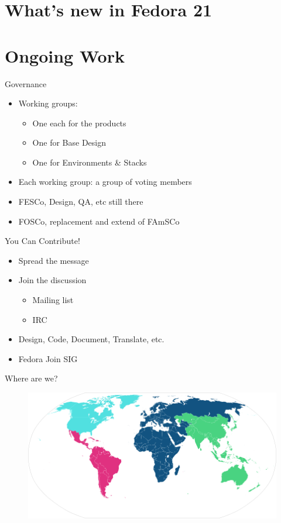 \documentclass{beamer}
\begin{document}
\section{What's new in Fedora 21}


\section{Ongoing Work}

\begin{frame}{Governance}
  \begin{itemize}
    \item Working groups:
      \begin{itemize}
        \item One each for the products
        \item One for Base Design
        \item One for Environments \& Stacks
      \end{itemize}
    \item Each working group: a group of voting members
    \item FESCo, Design, QA, etc still there
    \item FOSCo, replacement and extend of FAmSCo
  \end{itemize}
\end{frame}

\begin{frame}{You Can Contribute!}
  \begin{itemize}
    \item Spread the message
    \item Join the discussion
      \begin{itemize}
        \item Mailing list
        \item IRC
      \end{itemize}
    \item Design, Code, Document, Translate, etc.
    \item Fedora Join SIG
  \end{itemize}
\end{frame}

\begin{frame}{Where are we?}
  \begin{figure}[htbp]
    \centering
    \includegraphics[width=\textwidth]{Ambassador-World-Map.png}
  \end{figure}
\end{frame}
\end{document}
